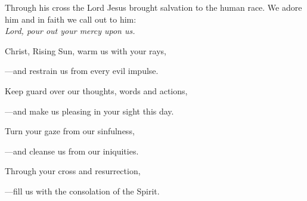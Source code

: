 \intercessions\indent

\begin{hangpar}

Through his cross the Lord Jesus brought salvation to the human race. We adore him and in faith we call out to him:\\
\emph{Lord, pour out your mercy upon us.}

\medskip Christ, Rising Sun, warm us with your rays,

{\color{red}---\thinspace}and restrain us from every evil impulse.

\medskip Keep guard over our thoughts, words and actions,

{\color{red}---\thinspace}and make us pleasing in your sight this day.

\medskip Turn your gaze from our sinfulness,

{\color{red}---\thinspace}and cleanse us from our iniquities.

\medskip Through your cross and resurrection,

{\color{red}---\thinspace}fill us with the consolation of the Spirit.

\end{hangpar}


